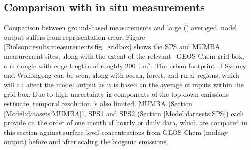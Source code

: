       
      
    
%      
%      

  
  \subsection{Comparison with in situ measurements}
    \label{BioIsop:results:measurements}
    
    Comparison between ground-based measurements and large (\lowhr) averaged model output suffers from representation error.
    Figure \ref{BioIsop:results:measurements:fig_gridbox} shows the SPS and MUMBA measurement sites, along with the extent of the relevant \lowhr ~GEOS-Chem grid box, a rectangle with edge lengths of roughly 200~km$^{2}$.
    The urban footprint of Sydney and Wollongong can be seen, along with ocean, forest, and rural regions, which will all affect the model output as it is based on the average of inputs within the grid box.
    Due to high uncertainty in components of the top-down emissions estimate, temporal resolution is also limited.
    MUMBA (Section \ref{Model:datasets:MUMBA}), SPS1 and SPS2 (Section \ref{Model:datasets:SPS}) each provide on the order of one month of hourly or daily data, which are compared in this section against surface level concentrations from GEOS-Chem (midday output) before and after scaling the biogenic emissions.
    
